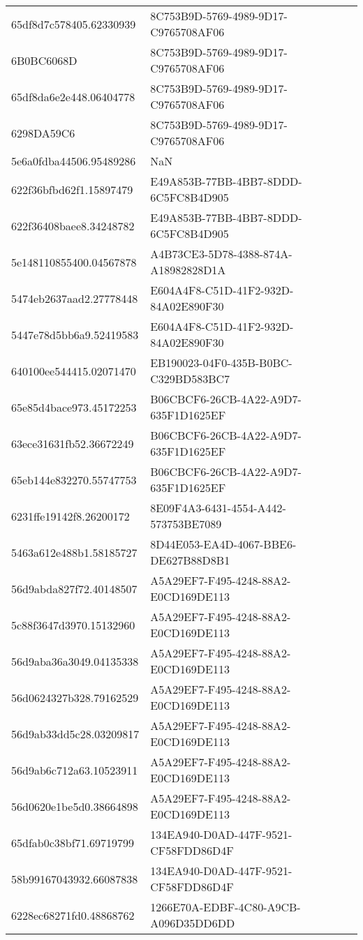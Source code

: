 \begin{tabular}{ll}
65df8d7c578405.62330939 & 8C753B9D-5769-4989-9D17-C9765708AF06 \\
6B0BC6068D & 8C753B9D-5769-4989-9D17-C9765708AF06 \\
65df8da6e2e448.06404778 & 8C753B9D-5769-4989-9D17-C9765708AF06 \\
6298DA59C6 & 8C753B9D-5769-4989-9D17-C9765708AF06 \\
5e6a0fdba44506.95489286 & NaN \\
622f36bfbd62f1.15897479 & E49A853B-77BB-4BB7-8DDD-6C5FC8B4D905 \\
622f36408baee8.34248782 & E49A853B-77BB-4BB7-8DDD-6C5FC8B4D905 \\
5e148110855400.04567878 & A4B73CE3-5D78-4388-874A-A18982828D1A \\
5474eb2637aad2.27778448 & E604A4F8-C51D-41F2-932D-84A02E890F30 \\
5447e78d5bb6a9.52419583 & E604A4F8-C51D-41F2-932D-84A02E890F30 \\
640100ee544415.02071470 & EB190023-04F0-435B-B0BC-C329BD583BC7 \\
65e85d4bace973.45172253 & B06CBCF6-26CB-4A22-A9D7-635F1D1625EF \\
63ece31631fb52.36672249 & B06CBCF6-26CB-4A22-A9D7-635F1D1625EF \\
65eb144e832270.55747753 & B06CBCF6-26CB-4A22-A9D7-635F1D1625EF \\
6231ffe19142f8.26200172 & 8E09F4A3-6431-4554-A442-573753BE7089 \\
5463a612e488b1.58185727 & 8D44E053-EA4D-4067-BBE6-DE627B88D8B1 \\
56d9abda827f72.40148507 & A5A29EF7-F495-4248-88A2-E0CD169DE113 \\
5c88f3647d3970.15132960 & A5A29EF7-F495-4248-88A2-E0CD169DE113 \\
56d9aba36a3049.04135338 & A5A29EF7-F495-4248-88A2-E0CD169DE113 \\
56d0624327b328.79162529 & A5A29EF7-F495-4248-88A2-E0CD169DE113 \\
56d9ab33dd5c28.03209817 & A5A29EF7-F495-4248-88A2-E0CD169DE113 \\
56d9ab6c712a63.10523911 & A5A29EF7-F495-4248-88A2-E0CD169DE113 \\
56d0620e1be5d0.38664898 & A5A29EF7-F495-4248-88A2-E0CD169DE113 \\
65dfab0c38bf71.69719799 & 134EA940-D0AD-447F-9521-CF58FDD86D4F \\
58b99167043932.66087838 & 134EA940-D0AD-447F-9521-CF58FDD86D4F \\
6228ec68271fd0.48868762 & 1266E70A-EDBF-4C80-A9CB-A096D35DD6DD \\

\end{tabular}
